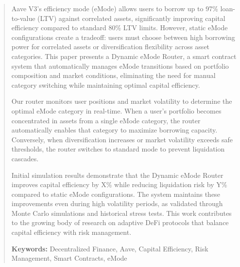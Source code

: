 \begin{abstract}

Aave V3's efficiency mode (eMode) allows users to borrow up to 97\% loan-to-value (LTV) against correlated assets, significantly improving capital efficiency compared to standard 80\% LTV limits. However, static eMode configurations create a tradeoff: users must choose between high borrowing power for correlated assets or diversification flexibility across asset categories. This paper presents a Dynamic eMode Router, a smart contract system that automatically manages eMode transitions based on portfolio composition and market conditions, eliminating the need for manual category switching while maintaining optimal capital efficiency.

Our router monitors user positions and market volatility to determine the optimal eMode category in real-time. When a user's portfolio becomes concentrated in assets from a single eMode category, the router automatically enables that category to maximize borrowing capacity. Conversely, when diversification increases or market volatility exceeds safe thresholds, the router switches to standard mode to prevent liquidation cascades.

Initial simulation results demonstrate that the Dynamic eMode Router improves capital efficiency by X\% while reducing liquidation risk by Y\% compared to static eMode configurations. The system maintains these improvements even during high volatility periods, as validated through Monte Carlo simulations and historical stress tests. This work contributes to the growing body of research on adaptive DeFi protocols that balance capital efficiency with risk management.

\textbf{Keywords:} Decentralized Finance, Aave, Capital Efficiency, Risk Management, Smart Contracts, eMode

\end{abstract}